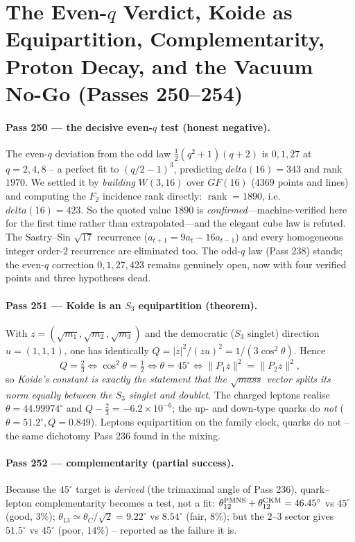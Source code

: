 \documentclass[12pt,a4paper]{article}
\def\mathrm#1{#1}%
\def\mathbf#1{#1}%
\def\textbf#1{#1}%
\def\text#1{#1}%
\def\delta{delta}%
\def\cdot{ }%
\theoremstyle{definition}
\begin{document}
\section{The Even-$q$ Verdict, Koide as Equipartition, Complementarity, Proton Decay, and the Vacuum No-Go (Passes 250--254)}

\paragraph{Pass 250 --- the decisive even-$q$ test (honest negative).} The
even-$q$ deviation from the odd law $\tfrac12(q^2+1)(q+2)$ is $0,1,27$ at
$q=2,4,8$ -- a perfect fit to $(q/2-1)^3$, predicting $\delta(16)=343$ and rank
$1970$. We settled it by \emph{building} $W(3,16)$ over $\mathrm{GF}(16)$ ($4369$
points and lines) and computing the $\mathbf F_2$ incidence rank directly:
$\operatorname{rank}=\mathbf{1890}$, i.e. $\delta(16)=423$. So the quoted value
$1890$ is \emph{confirmed}---machine-verified here for the first time rather than
extrapolated---and the elegant cube law is \textbf{refuted}. The
Sastry--Sin $\sqrt{17}$ recurrence ($a_{t+1}=9a_t-16a_{t-1}$) and every
homogeneous integer order-$2$ recurrence are eliminated too. The odd-$q$ law
(Pass 238) stands; the even-$q$ correction $0,1,27,423$ remains genuinely open,
now with four verified points and three hypotheses dead.

\paragraph{Pass 251 --- Koide is an $S_3$ equipartition (theorem).} With
$z=(\sqrt{m_1},\sqrt{m_2},\sqrt{m_3})$ and the democratic ($S_3$ singlet)
direction $u=(1,1,1)$, one has identically
$Q=|z|^2/(z\cdot u)^2 = 1/(3\cos^2\theta)$. Hence
\[
   Q=\tfrac23 \iff \cos^2\theta=\tfrac12 \iff \theta=45^\circ
   \iff \|P_{\mathbf 1}z\|^2=\|P_{\mathbf 2}z\|^2 ,
\]
so \emph{Koide's constant is exactly the statement that the $\sqrt{\text{mass}}$
vector splits its norm equally between the $S_3$ singlet and doublet}. The
charged leptons realise $\theta=44.99974^\circ$ and $Q-\tfrac23=-6.2\times
10^{-6}$; the up- and down-type quarks do \emph{not} ($\theta=51.2^\circ,
Q=0.849$). Leptons equipartition on the family clock, quarks do not -- the same
dichotomy Pass 236 found in the mixing.

\paragraph{Pass 252 --- complementarity (partial success).} Because the
$45^\circ$ target is \emph{derived} (the trimaximal angle of Pass 236), quark--lepton
complementarity becomes a test, not a fit: $\theta_{12}^{\rm PMNS}+\theta_{12}^{\rm
CKM}=46.45^\circ$ vs $45^\circ$ (good, $3\%$); $\theta_{13}\simeq\theta_C/\sqrt2
=9.22^\circ$ vs $8.54^\circ$ (fair, $8\%$); but the $2$--$3$ sector gives
$51.5^\circ$ vs $45^\circ$ (poor, $14\%$) -- reported as the failure it is.
\end{document}
